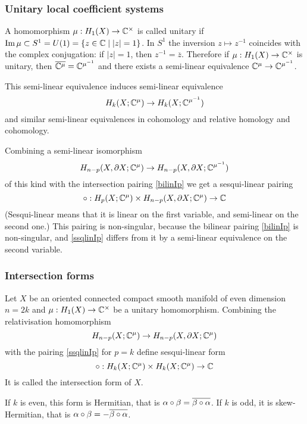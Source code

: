 \documentclass{article}
\numberwithin{equation}{section}
\begin{document}
\subsubsection{Unitary local coefficient systems}\label{sT.4.5} 
A homomorphism $\mu:H_1(X)\to\mathbb C^\times$ is called {\sfit unitary\/} if
$\operatorname{Im}\mu\subset S^1=U(1)=\{z\in\mathbb C\mid |z|=1\}$. In $S^1$ the inversion
$z\mapsto z^{-1}$ coincides with the complex conjugation: if $|z|=1$, then
$z^{-1}=\overline z$. Therefore if $\mu:H_1(X)\to\mathbb C^\times$ is unitary, 
then $\overline{\mathbb C^\mu}=\mathbb C^{\mu^{-1}}$ and there exists a 
{\sfit semi-linear\/ } equivalence $\mathbb C^\mu\to\mathbb C^{\mu^{-1}}$. 

This semi-linear equivalence induces semi-linear equivalence
$$H_{k}(X;\mathbb C^\mu)\to H_k(X;\mathbb C^{\mu^{-1}})$$ 
and similar semi-linear equivalences in cohomology and relative 
homology and cohomology.

Combining a semi-linear isomorphism 
$$H_{n-p}(X,\partial X;\mathbb C^\mu)\to H_{n-p}(X,\partial X;\mathbb C^{\mu^{-1}})$$ 
of this kind with the intersection
pairing \eqref{bilinIp} we get a {\sfit sesqui-linear \/} pairing
\begin{equation}\label{ssqlinIp}
 \circ:H_p(X;\mathbb C^\mu)\times H_{n-p}(X,\partial X;\mathbb C^{\mu})\to \mathbb C 
\end{equation}
(Sesqui-linear means that it is linear on the first variable, and
semi-linear on the second one.) This pairing is non-singular, because
the bilinear pairing  \eqref{bilinIp} is non-singular, and  \eqref{ssqlinIp}
differs from it by a semi-linear equivalence on the second variable.

\subsubsection{Intersection forms}\label{sT.4.6} 
Let $X$ be an oriented connected compact smooth manifold of even 
dimension $n=2k$ and $\mu:H_1(X)\to\mathbb C^\times$ be a unitary homomorphism.
Combining the relativisation homomorphism 
$$
H_{n-p}(X;\mathbb C^{\mu})\to H_{n-p}(X,\partial X;\mathbb C^\mu)
$$
with the pairing \eqref{ssqlinIp} for $p=k$  define sesqui-linear form
\begin{equation}\label{ssqlinIf}
\circ:H_k(X;\mathbb C^\mu)\times H_k(X;\mathbb C^\mu)\to\mathbb C
\end{equation}
It is called the {\sfit intersection form\/} of $X$. 

If $k$ is even, this form is {\sfit Hermitian\/}, that is $\alpha\circ\beta=\overline{\beta\circ\alpha}$.
If $k$ is odd, it is {\sfit skew-Hermitian\/}, that is
$\alpha\circ\beta=-\overline{\beta\circ\alpha}$. 
\end{document}
